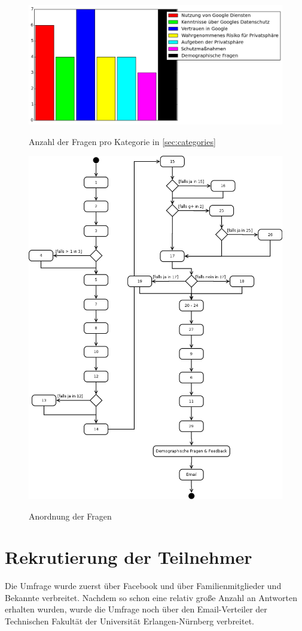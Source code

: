 \begin{figure}[H]
\centering
\includegraphics[width=\textwidth]{images/zahlenkategorien}\\
\caption{Anzahl der Fragen pro Kategorie in \ref{sec:categories}}\label{catnumbers}
\end{figure}

\begin{figure}[H]
\centering
\includegraphics[height=\textheight]{images/umldia}\\
\caption{Anordnung der Fragen}\label{umldia}
\end{figure}


\section{Rekrutierung der Teilnehmer}
Die Umfrage wurde zuerst über Facebook und über Familienmitglieder und Bekannte verbreitet. Nachdem so schon eine relativ große Anzahl an Antworten erhalten wurden, wurde die Umfrage noch über den Email-Verteiler der Technischen Fakultät der Universität Erlangen-Nürnberg verbreitet.